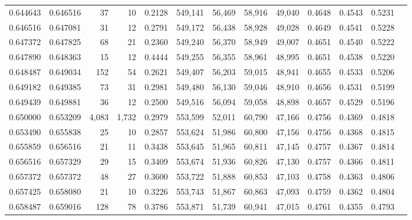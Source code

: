 \begin{tabular}{rrrrrrrrrrrrr}
0.644643 & 0.646516 &     37 &    10 &                                     0.2128 & 549,141 &  56,469 &  58,916 &  49,040 & 0.4648 & 0.4543 & 0.5231 \\
0.646516 & 0.647081 &     31 &    12 &                                     0.2791 & 549,172 &  56,438 &  58,928 &  49,028 & 0.4649 & 0.4541 & 0.5228 \\
0.647372 & 0.647825 &     68 &    21 &                                     0.2360 & 549,240 &  56,370 &  58,949 &  49,007 & 0.4651 & 0.4540 & 0.5222 \\
0.647890 & 0.648363 &     15 &    12 &                                     0.4444 & 549,255 &  56,355 &  58,961 &  48,995 & 0.4651 & 0.4538 & 0.5220 \\
0.648487 & 0.649034 &    152 &    54 &                                     0.2621 & 549,407 &  56,203 &  59,015 &  48,941 & 0.4655 & 0.4533 & 0.5206 \\
0.649182 & 0.649385 &     73 &    31 &                                     0.2981 & 549,480 &  56,130 &  59,046 &  48,910 & 0.4656 & 0.4531 & 0.5199 \\
0.649439 & 0.649881 &     36 &    12 &                                     0.2500 & 549,516 &  56,094 &  59,058 &  48,898 & 0.4657 & 0.4529 & 0.5196 \\
0.650000 & 0.653209 &  4,083 & 1,732 &                                     0.2979 & 553,599 &  52,011 &  60,790 &  47,166 & 0.4756 & 0.4369 & 0.4818 \\
0.653490 & 0.655838 &     25 &    10 &                                     0.2857 & 553,624 &  51,986 &  60,800 &  47,156 & 0.4756 & 0.4368 & 0.4815 \\
0.655859 & 0.656516 &     21 &    11 &                                     0.3438 & 553,645 &  51,965 &  60,811 &  47,145 & 0.4757 & 0.4367 & 0.4814 \\
0.656516 & 0.657329 &     29 &    15 &                                     0.3409 & 553,674 &  51,936 &  60,826 &  47,130 & 0.4757 & 0.4366 & 0.4811 \\
0.657372 & 0.657372 &     48 &    27 &                                     0.3600 & 553,722 &  51,888 &  60,853 &  47,103 & 0.4758 & 0.4363 & 0.4806 \\
0.657425 & 0.658080 &     21 &    10 &                                     0.3226 & 553,743 &  51,867 &  60,863 &  47,093 & 0.4759 & 0.4362 & 0.4804 \\
0.658487 & 0.659016 &    128 &    78 &                                     0.3786 & 553,871 &  51,739 &  60,941 &  47,015 & 0.4761 & 0.4355 & 0.4793 \\

\end{tabular}
